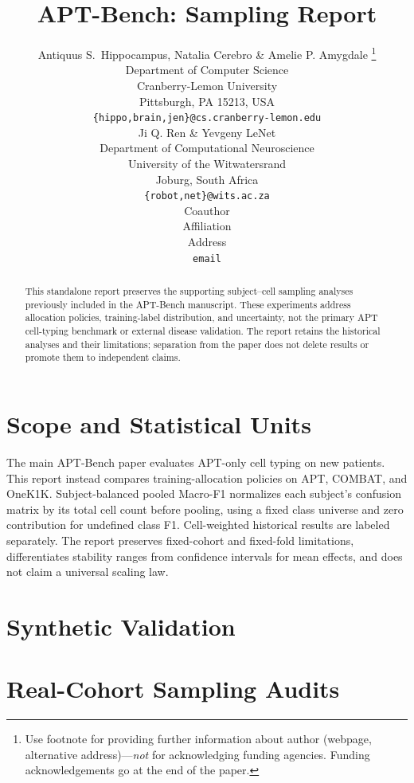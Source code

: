 \documentclass{article} %
\title{APT-Bench: Sampling Report}
\author{Antiquus S.~Hippocampus, Natalia Cerebro \& Amelie P. Amygdale \thanks{ Use footnote for providing further information
about author (webpage, alternative address)---\emph{not} for acknowledging
funding agencies.  Funding acknowledgements go at the end of the paper.} \\
Department of Computer Science\\
Cranberry-Lemon University\\
Pittsburgh, PA 15213, USA \\
\texttt{\{hippo,brain,jen\}@cs.cranberry-lemon.edu} \\
\And
Ji Q. Ren \& Yevgeny LeNet \\
Department of Computational Neuroscience \\
University of the Witwatersrand \\
Joburg, South Africa \\
\texttt{\{robot,net\}@wits.ac.za} \\
\AND
Coauthor \\
Affiliation \\
Address \\
\texttt{email}
}
\begin{document}
\maketitle
\begin{abstract}
This standalone report preserves the supporting subject--cell sampling
analyses previously included in the APT-Bench manuscript. These experiments
address allocation policies, training-label distribution, and uncertainty,
not the primary APT cell-typing benchmark or external disease validation.
The report retains the historical analyses and their limitations; separation
from the paper does not delete results or promote them to independent claims.
\end{abstract}
\section{Scope and Statistical Units}
The main APT-Bench paper evaluates APT-only cell typing on new patients.
This report instead compares training-allocation policies on APT, COMBAT,
and OneK1K. Subject-balanced pooled Macro-F1 normalizes each subject's
confusion matrix by its total cell count before pooling, using a fixed
class universe and zero contribution for undefined class F1. Cell-weighted
historical results are labeled separately. The report preserves fixed-cohort
and fixed-fold limitations, differentiates stability ranges from confidence
intervals for mean effects, and does not claim a universal scaling law.
\section{Synthetic Validation}

\section{Real-Cohort Sampling Audits}

\clearpage

\clearpage


\end{document}
